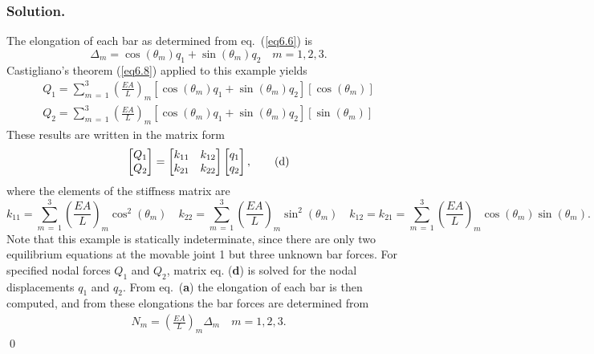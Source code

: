 \documentclass{AeroStructure-ERJohnson}
\begin{document}
\begin{example*}
\subsubsection{Solution.} The elongation of each bar as determined from eq.~(\ref{eq6.6}) is
\begin{equation*}
\Delta_{m}=\cos \left(\theta_{m}\right) q_{1}+\sin \left(\theta_{m}\right) q_{2} \quad m=1,2,3.
\tag{a}
\end{equation*}
Castigliano's theorem (\ref{eq6.8}) applied to this example yields
\begin{gather*}
Q_{1}=\sum_{m\,=\,1}^3\left(\frac{E A}{L}\right)_{m}\left[\cos \left(\theta_{m}\right) q_{1}+\sin \left(\theta_{m}\right) q_{2}\right]\left[\cos \left(\theta_{m}\right)\right] \tag{b}\\
Q_{2}=\sum_{m\,=\,1}^3\left(\frac{E A}{L}\right)_{m}\left[\cos \left(\theta_{m}\right) q_{1}+\sin \left(\theta_{m}\right) q_{2}\right]\left[\sin \left(\theta_{m}\right)\right]\tag{c}
\end{gather*}
These results are written in the matrix form
\begin{equation*}
\left[\begin{array}{@{}l@{}}Q_{1} \\Q_{2}\end{array}\right]=\left[\begin{array}{@{}ll@{}}k_{11} & k_{12} \\k_{21} & k_{22}\end{array}\right]\left[\begin{array}{@{}l@{}}q_{1} \\q_{2}\end{array}\right],\tag{d}
\end{equation*}
where the elements of the stiffness matrix are
\begin{equation*}
k_{11}=\sum_{m\,=\,1}^{3}\left(\frac{E A}{L}\right)_{m}\cos^{2}\left(\theta_{m}\right) \quad k_{22}=\sum_{m\,=\,1}^{3}\left(\frac{E A}{L}\right)_{m} \sin^{2}\left(\theta_{m}\right) \quad k_{12}=k_{21}=\sum_{m\,=\,1}^{3}\left(\frac{E A}{L}\right)_{m} \cos \left(\theta_{m}\right) \sin \left(\theta_{m}\right).\tag{e}
\end{equation*}
Note that this example is statically indeterminate, since there are only two equilibrium equations at the movable joint 1 but three unknown bar forces. For specified nodal forces $Q_1$ and $Q_2$, matrix eq. (\textbf{d}) is solved for the nodal displacements $q_1$ and $q_2$. From eq.~(\textbf{a}) the elongation of each bar is then computed, and from these elongations the bar forces are determined from
\begin{align*}
N_{m}=\left(\frac{E A}{L}\right)_{m} \Delta_{m} \quad m=1,2,3.\tag{f}
\end{align*}\hfill\qed
\end{example*}
\end{document}

